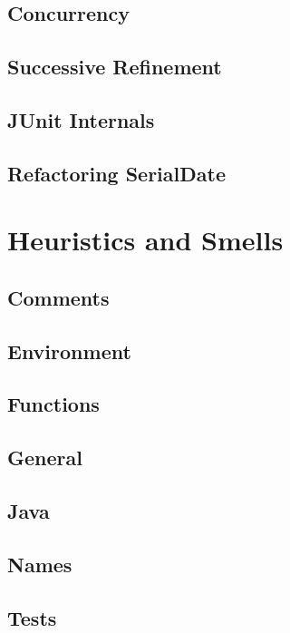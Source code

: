 \documentclass[a4paper, twocolumn]{article}
\begin{document}
\subsection{Concurrency}

\subsection{Successive Refinement}

\subsection{JUnit Internals}

\subsection{Refactoring SerialDate}


\section{Heuristics and Smells}

\subsection{Comments}

\subsection{Environment}

\subsection{Functions}

\subsection{General}

\subsection{Java}

\subsection{Names}

\subsection{Tests}
\end{document}

